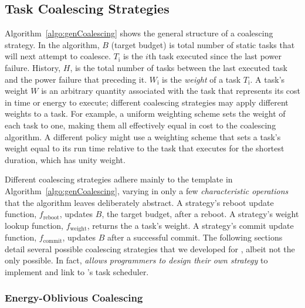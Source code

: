 \subsection{Task Coalescing Strategies}
\label{subsec:coalescingStrategies}

Algorithm~\ref{algo:genCoalescing} shows the general structure of a coalescing strategy. In the algorithm, $B$ (target budget) is total number of static tasks that \sys will next attempt to coalesce. $T_\text{i}$ is the $i$th task executed since the last power failure. History, $H$, is the total number of tasks between the last executed task and the power failure that preceding it. $W_\text{i}$ is the {\em weight} of a task $T_\text{i}$. A task's weight $W$ is an arbitrary quantity associated with the task that represents its cost in time or energy to execute; different coalescing strategies may apply different weights to a task. For example, a uniform weighting scheme sets the weight of each task to one, making them all effectively equal in cost to the coalescing algorithm.  A different policy might use a weighting scheme that sets a task's weight equal to its run time relative to the task that executes for the shortest duration, which has unity weight. 

Different coalescing strategies adhere mainly to the template in Algorithm~\ref{algo:genCoalescing}, varying in only a few {\em characteristic operations} that the algorithm leaves deliberately abstract. A strategy's reboot update function, $f_\text{reboot}$, updates $B$, the target budget, after a reboot. A strategy's weight lookup function, $f_\text{weight}$, returns the a task's weight.  A strategy's commit update function, $f_\text{commit}$, updates $B$ after a successful commit. The following sections detail several possible coalescing strategies that we developed for \sys, albeit not the only possible. In fact, \sys \emph{allows programmers to design their own strategy} to implement and link to \sys's task scheduler. 

\subsubsection{Energy-Oblivious Coalescing}
\label{subsec:energyBlind}
 
